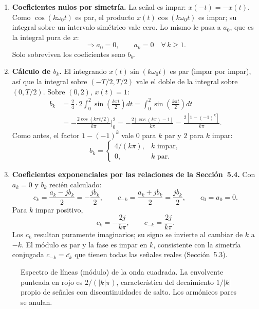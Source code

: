 \documentclass[10pt,a4paper]{article}
\begin{document}
	\begin{enumerate}[label=\textbf{\alph*)}]
		\item \textbf{Coeficientes nulos por simetría.} La señal es impar: $x(-t) = -x(t)$. Como $\cos(k\omega_0 t)$ es par, el producto $x(t)\cos(k\omega_0 t)$ es impar; su integral sobre un intervalo simétrico vale cero. Lo mismo le pasa a $a_0$, que es la integral pura de $x$:
		\[
			\Rightarrow a_0 = 0, \qquad a_k = 0 \quad \forall\, k \geq 1.
		\]
		Solo sobreviven los coeficientes seno $b_k$.

		\item \textbf{Cálculo de $b_k$.} El integrando $x(t)\sin(k\omega_0 t)$ es par (impar por impar), así que la integral sobre $(-T/2, T/2)$ vale el doble de la integral sobre $(0, T/2)$. Sobre $(0, 2)$, $x(t) = 1$:
		\begin{align*}
			b_k &= \frac{2}{4}\cdot 2\int_{0}^{2} \sin\!\left(\frac{k\pi t}{2}\right)dt
			= \int_{0}^{2}\sin\!\left(\frac{k\pi t}{2}\right)dt \\
			&= -\frac{2\cos(k\pi t/2)}{k\pi}\bigg|_{0}^{2}
			= -\frac{2[\cos(k\pi) - 1]}{k\pi}
			= \frac{2[1 - (-1)^k]}{k\pi}.
		\end{align*}
		Como antes, el factor $1 - (-1)^k$ vale $0$ para $k$ par y $2$ para $k$ impar:
		\[
			\boxed{b_k =
			\begin{cases}
				4/(k\pi), & k \text{ impar}, \\
				0, & k \text{ par}.
			\end{cases}}
		\]

		\item \textbf{Coeficientes exponenciales por las relaciones de la Sección~5.4.} Con $a_k = 0$ y $b_k$ recién calculado:
		\[
			c_k = \frac{a_k - jb_k}{2} = -\frac{jb_k}{2}, \qquad
			c_{-k} = \frac{a_k + jb_k}{2} = \frac{jb_k}{2}, \qquad
			c_0 = a_0 = 0.
		\]
		Para $k$ impar positivo,
		\[
			\boxed{c_k = -\frac{2j}{k\pi}, \qquad c_{-k} = \frac{2j}{k\pi}.}
		\]
		Los $c_k$ resultan puramente imaginarios; su signo se invierte al cambiar de $k$ a $-k$. El módulo es par y la fase es impar en $k$, consistente con la simetría conjugada $c_{-k} = \overline{c_k}$ que tienen todas las señales reales (Sección~5.3).
	\end{enumerate}

	\begin{figure}[H]
		\centering
		
		\caption{Espectro de líneas (módulo) de la onda cuadrada. La envolvente punteada en rojo es $2/(|k|\pi)$, característica del decaimiento $1/|k|$ propio de señales con discontinuidades de salto. Los armónicos pares se anulan.}
		\label{fig:ej8}
	\end{figure}
\end{document}
